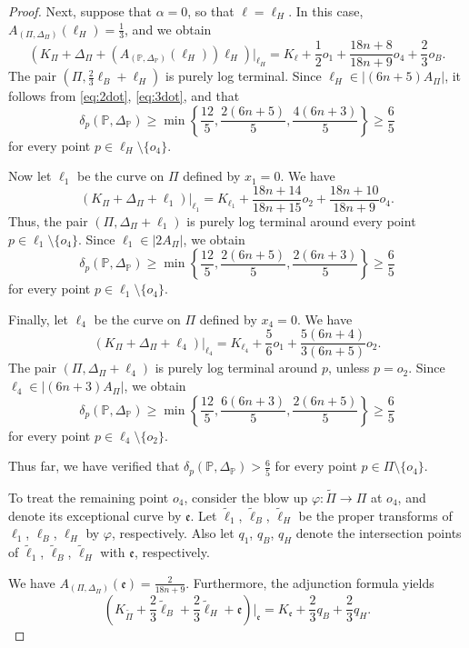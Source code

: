 \documentclass[12pt]{amsart}
\theoremstyle{definition}
\theoremstyle{remark}
\begin{document}
\begin{proof}
Next, suppose that $\alpha=0$, so that $\ell=\ell_H$. In this case, $A_{(\Pi, \Delta_\Pi)}(\ell_H)=\frac{1}{3}$, and
we obtain
\[\left(K_\Pi+\Delta_\Pi+\left(A_{(\mathbb{P}, \Delta_\mathbb{P})}(\ell_H)\right)\ell_H\right)\big|_{\ell_H}= K_\ell+\frac{1}{2}o_1+ \frac{18n+8}{18n+9}o_4+\frac{2}{3}o_B.
\]
The pair $(\Pi, \frac{2}{3}\ell_B+\ell_H)$ is purely log terminal.
Since $\ell_H \in |(6n+5)A_\Pi|$, it follows from \eqref{eq:2dot}, \eqref{eq:3dot}, and \cite[Corollary~4.8]{Fu23} that
 \[\delta_p\left(\mathbb{P}, \Delta_\mathbb{P}\right)\geq \min\left\{\frac{12}{5}, \frac{2(6n+5)}{5}, \frac{4(6n+3)}{5}\right\}\geq\frac{6}{5}\]
for every point $p\in \ell_H\setminus\{o_4\}$.

Now let $\ell_1$ be the curve on $\Pi$ defined by $x_1=0$. We have
\[\left(K_\Pi+\Delta_\Pi+\ell_1\right)\big|_{\ell_1}= K_{\ell_1}+\frac{18n+14}{18n+15}o_2+ \frac{18n+10}{18n+9}o_4. 
\]
Thus, the pair $(\Pi, \Delta_\Pi+\ell_1)$ is purely log terminal around every point
$p\in\ell_1\setminus\{o_4\}$. 
Since $\ell_1 \in |2A_\Pi|$, we obtain
\[\delta_p\left(\mathbb{P}, \Delta_\mathbb{P}\right)\geq \min\left\{\frac{12}{5}, \frac{2(6n+5)}{5}, \frac{2(6n+3)}{5}\right\}\geq\frac{6}{5}\]
for every point $p\in \ell_1\setminus\{o_4\}$.

Finally, let $\ell_4$ be the curve on $\Pi$ defined by $x_4=0$.
We have
\[\left(K_\Pi+\Delta_\Pi+\ell_4\right)\big|_{\ell_4}= K_{\ell_4}+\frac{5}{6}o_1+ \frac{5(6n+4)}{3(6n+5)}o_2.
\]
The pair $(\Pi, \Delta_\Pi+\ell_4)$ is purely log terminal around $p$, unless $p=o_2$.
Since $\ell_4 \in |(6n+3)A_\Pi|$, we obtain
\[\delta_p\left(\mathbb{P}, \Delta_\mathbb{P}\right)\geq \min\left\{\frac{12}{5}, \frac{6(6n+3)}{5}, \frac{2(6n+5)}{5}\right\}\geq\frac{6}{5}\]
for every point $p\in \ell_4\setminus\{o_2\}$.

Thus far, we have verified that $\delta_p\left(\mathbb{P}, \Delta_\mathbb{P}\right)>\frac{6}{5}$ for every point $p\in \Pi\setminus\{o_4\}$.




To treat the remaining point $o_4$, consider the blow up $\varphi:\widetilde{\Pi}\to \Pi$ at $o_4$, and denote its exceptional curve  by $\mathfrak{e}$. Let  $\widetilde{\ell}_1$, $\widetilde{\ell}_B$, $\widetilde{\ell}_H$ be the proper transforms of $\ell_1$, $\ell_B$, $\ell_H$ by $\varphi$, respectively. Also let $q_1$, $q_B$, $q_H$ denote the intersection points of $\widetilde{\ell}_1$, $\widetilde{\ell}_B$, $\widetilde{\ell}_H$ with $\mathfrak{e}$, respectively.

We have $A_{(\Pi,\Delta_\Pi)}(\mathfrak{e})=\frac{2}{18n+9}$. Furthermore,   the adjunction formula yields
\[\left(K_{\widetilde{\Pi}}+\frac{2}{3}\widetilde{\ell}_B+\frac{2}{3}\widetilde{\ell}_H+\mathfrak{e}\right)\Big|_\mathfrak{e}=K_\mathfrak{e}+\frac{2}{3}q_B+\frac{2}{3}q_H.\]


\end{proof}
\end{document}
